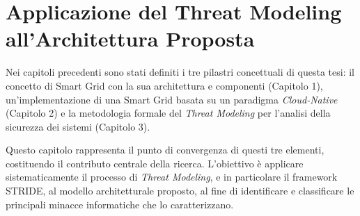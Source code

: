 \newpage
\chapter{Applicazione del Threat Modeling all'Architettura Proposta}








Nei capitoli precedenti sono stati definiti i tre pilastri concettuali di questa tesi: il concetto di Smart Grid con la sua architettura e componenti (Capitolo 1), un'implementazione di una Smart Grid basata su un paradigma \textit{Cloud-Native} (Capitolo 2) e la metodologia formale del \textit{Threat Modeling} per l'analisi della sicurezza dei sistemi (Capitolo 3).

Questo capitolo rappresenta il punto di convergenza di questi tre elementi, costituendo il contributo centrale della ricerca. L'obiettivo è applicare sistematicamente il processo di \textit{Threat Modeling}, e in particolare il framework STRIDE, al modello architetturale proposto, al fine di identificare e classificare le principali minacce informatiche che lo caratterizzano.


